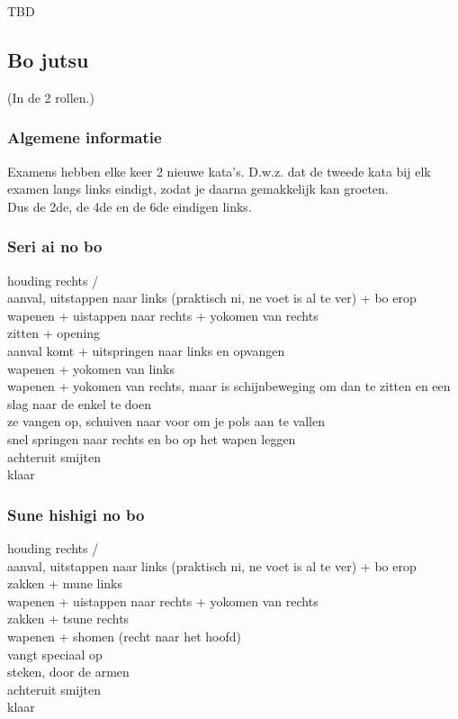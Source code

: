 TBD

\subsection{Bo jutsu}
(In de 2 rollen.)

\subsubsection{Algemene informatie}

Examens hebben elke keer 2 nieuwe kata's. D.w.z. dat de tweede kata bij elk examen langs links eindigt, zodat je daarna gemakkelijk kan groeten.\\
Dus de 2de, de 4de en de 6de eindigen links.

\subsubsection{Seri ai no bo}

houding rechts /\\
aanval, uitstappen naar links (praktisch ni, ne voet is al te ver) + bo erop\\
wapenen + uistappen naar rechts + yokomen van rechts\\
zitten + opening\\
aanval komt + uitspringen naar links en opvangen\\
wapenen + yokomen van links\\
wapenen + yokomen van rechts, maar is schijnbeweging om dan te zitten en een slag naar de enkel te doen\\
ze vangen op, schuiven naar voor om je pols aan te vallen\\
snel springen naar rechts en bo op het wapen leggen\\
achteruit smijten\\
klaar

\subsubsection{Sune hishigi no bo}

houding rechts /\\
aanval, uitstappen naar links (praktisch ni, ne voet is al te ver) + bo erop\\
zakken + mune links\\
wapenen + uistappen naar rechts + yokomen van rechts\\
zakken + tsune rechts\\
wapenen + shomen (recht naar het hoofd)\\
vangt speciaal op\\
steken, door de armen\\
achteruit smijten\\
klaar

